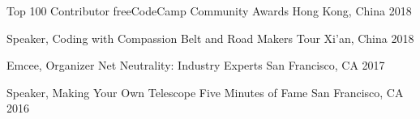 



\begin{cvhonors}

  \cvhonor
    {Top 100 Contributor} %
    {freeCodeCamp Community Awards} %
    {Hong Kong, China} %
    {2018} %
    
  \cvhonor
    {Speaker, Coding with Compassion} %
    {Belt and Road Makers Tour} %
    {Xi'an, China} %
    {2018} %
    
\end{cvhonors}




\begin{cvhonors}

  \cvhonor
    {Emcee, Organizer} %
    {Net Neutrality: Industry Experts} %
    {San Francisco, CA} %
    {2017} %

  \cvhonor
    {Speaker, Making Your Own Telescope} %
    {Five Minutes of Fame} %
    {San Francisco, CA} %
    {2016} %

\end{cvhonors}
